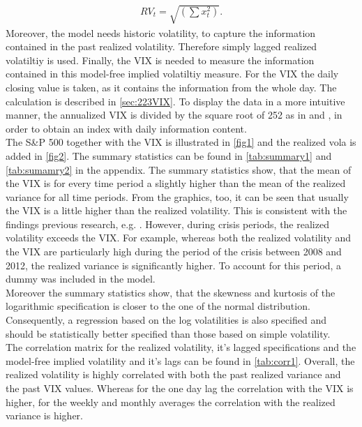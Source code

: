\begin{align}
RV_{t} = \sqrt{(\sum x_{t}^{2})}.
\end{align}
Moreover, the model needs historic volatility, to capture the information contained in the past realized volatility. Therefore simply lagged realized volatiltiy is used. 
Finally, the VIX is needed to measure the information contained in this model-free implied volatiltiy measure. For the VIX the daily closing value is taken, as it contains the information from the whole day. The calculation is described in \ref{sec:223VIX}. To display the data in a more intuitive manner, the annualized VIX is divided by the square root of 252 as in \textcite{blair2001} and \textcite{whaley2008}, in order to obtain an index with daily information content.\\
The S\&P 500 together with the VIX is illustrated in \ref{fig1} and the realized vola is added in \ref{fig2}. The summary statistics can be found in \ref{tab:summary1} and \ref{tab:sumamry2} in the appendix. The summary statistics show, that the mean of the VIX is for every time period a slightly higher than the mean of the realized variance for all time periods. From the graphics, too, it can be seen that usually the VIX is a little higher than the realized volatility. This is consistent with the findings previous research, e.g. \textcite{jiang2003}. However, during crisis periods, the realized volatility exceeds the VIX. For example, whereas both the realized volatility and the VIX are particularly high during the period of the crisis between 2008 and 2012, the realized variance is significantly higher. To account for this period, a dummy was included in the model.\\ Moreover the summary statistics show, that the skewness and kurtosis of the logarithmic specification is closer to the one of the normal distribution. Consequently, a regression based on the log volatilities is also specified and should be statistically better specified than those based on simple volatility. \\
The correlation matrix for the realized volatility, it's lagged specifications and the model-free implied volatility and it's lags can be found in \ref{tab:corr1}. Overall, the realized volatility is highly correlated with both the past realized variance and the past VIX values. Whereas for the one day lag the correlation with the VIX is higher, for the weekly and monthly averages the correlation with the realized variance is higher. 


